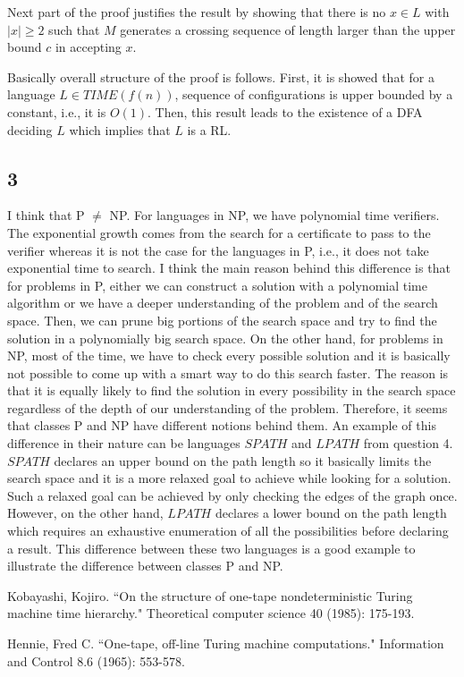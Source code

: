 \documentclass[12pt]{article}
\begin{document}
Next part of the proof justifies the result by showing that there is no $x \in L$ with $|x| \geq 2$ such that $M$ generates a crossing sequence of length larger than the upper bound $c$ in accepting $x$.

Basically overall structure of the proof is follows. First, it is showed that for a language $L \in TIME(f(n))$,  sequence of configurations is upper bounded by a constant, i.e., it is $O(1)$. Then, this result leads to the existence of a DFA deciding $L$ which implies that $L$ is a RL.

\subsection*{3}

I think that P $\neq$ NP. For languages in NP, we have polynomial time verifiers. The exponential growth comes from the search for a certificate to pass to the verifier whereas it is not the case for the languages in P, i.e., it does not take exponential time to search. I think the main reason behind this difference is that for problems in P, either we can construct a solution with a polynomial time algorithm or we have a deeper understanding of the problem and of the search space. Then, we can prune big portions of the search space and try to find the solution in a polynomially big search space. On the other hand, for problems in NP, most of the time, we have to check every possible solution and it is basically not possible to come up with a smart way to do this search faster. The reason is that it is equally likely to find the solution in every possibility in the search space regardless of the depth of our understanding of the problem. Therefore, it seems that classes P and NP have different notions behind them. An example of this difference in their nature can be languages $SPATH$ and $LPATH$ from question 4. $SPATH$ declares an upper bound on the path length so it basically limits the search space and it is a more relaxed goal to achieve while looking for a solution. Such a relaxed goal can be achieved by only checking the edges of the graph once. However, on the other hand, $LPATH$ declares a lower bound on the path length which requires an exhaustive enumeration of all the possibilities before declaring a result. This difference between these two languages is a good example to illustrate the difference between classes P and NP.

\begin{thebibliography}{2}

 Kobayashi, Kojiro. ``On the structure of one-tape nondeterministic Turing machine time hierarchy." Theoretical computer science 40 (1985): 175-193.

 Hennie, Fred C. ``One-tape, off-line Turing machine computations." Information and Control 8.6 (1965): 553-578.

\end{thebibliography}
\end{document}
